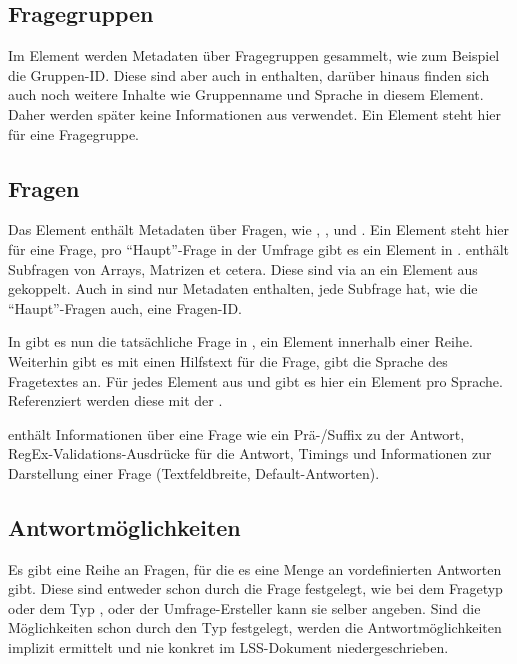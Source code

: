 \subsection{Fragegruppen}

Im Element  werden Metadaten über Fragegruppen gesammelt, wie zum Beispiel die Gruppen-ID.
Diese sind aber auch in  enthalten, darüber hinaus finden sich auch noch weitere Inhalte wie Gruppenname und Sprache in diesem Element.
Daher werden später keine Informationen aus  verwendet.
Ein  Element steht hier für eine Fragegruppe.

\subsection{Fragen}

Das Element  enthält Metadaten über Fragen, wie , ,  und .
Ein  Element steht hier für eine Frage, pro \enquote{Haupt}-Frage in der Umfrage gibt es ein Element in .
 enthält Subfragen von Arrays, Matrizen et cetera. Diese sind via  an ein Element aus  gekoppelt.
Auch in  sind nur Metadaten enthalten, jede Subfrage hat, wie die \enquote{Haupt}-Fragen auch, eine Fragen-ID.

In  gibt es nun die tatsächliche Frage in , ein Element innerhalb einer Reihe.
Weiterhin gibt es mit  einen Hilfstext für die Frage,  gibt die Sprache des Fragetextes an.
Für jedes Element aus  und  gibt es hier ein Element pro Sprache.
Referenziert werden diese mit der .

 enthält Informationen über eine Frage wie ein Prä-/Suffix zu der Antwort, RegEx-Validations-Ausdrücke für die Antwort, Timings und Informationen zur Darstellung einer Frage (Textfeldbreite, Default-Antworten).

\subsection{Antwortmöglichkeiten}

Es gibt eine Reihe an Fragen, für die es eine Menge an vordefinierten Antworten gibt.
Diese sind entweder schon durch die Frage festgelegt, wie bei dem Fragetyp  oder dem Typ , oder der Umfrage-Ersteller kann sie selber angeben.
Sind die Möglichkeiten schon durch den Typ festgelegt, werden die Antwortmöglichkeiten implizit ermittelt und nie konkret im LSS-Dokument niedergeschrieben.

